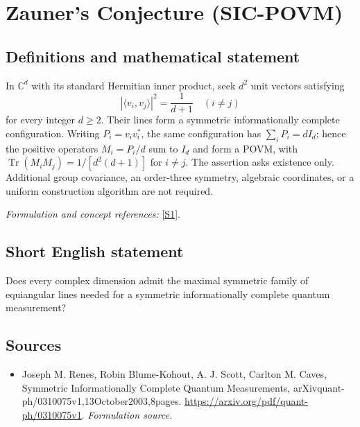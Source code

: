 \documentclass[11pt]{article}
\begin{document}
\section*{\texorpdfstring{Zauner's Conjecture (SIC-POVM)}{Zauner's Conjecture (SIC-POVM)}}\label{1305}
\subsection{Definitions and mathematical statement}
In ${\mathbb{C}}^d$ with its standard Hermitian inner product, seek $d^2$ unit vectors satisfying
\[
 |\langle v_i,v_j\rangle|^2=\frac1{d+1}\quad(i\ne j)
\]
for every integer $d\ge2$. Their lines form a symmetric informationally complete configuration. Writing $P_i=v_iv_i^*$, the same configuration has
$\sum_iP_i=dI_d$; hence the positive operators $M_i=P_i/d$ sum to $I_d$ and form a POVM, with
$\operatorname{Tr}(M_iM_j)=1/[d^2(d+1)]$ for $i\ne j$. The assertion asks existence only. Additional group covariance, an order-three symmetry, algebraic coordinates, or a uniform construction algorithm are not required.
\par\smallskip\textit{Formulation and concept references:} \href{https://arxiv.org/pdf/quant-ph/0310075v1}{[S1]}.

\subsection{Short English statement}
Does every complex dimension admit the maximal symmetric family of equiangular lines needed for a symmetric informationally complete quantum measurement?
\subsection{Sources}
\begin{itemize}
\item[S1]Joseph M. Renes, Robin Blume-Kohout, A. J. Scott, Carlton M. Caves, Symmetric Informationally Complete Quantum Measurements, arXivquant-ph/0310075v1,13October2003,8pages.
\url{https://arxiv.org/pdf/quant-ph/0310075v1}.
\textit{Formulation source.}
\end{itemize}
\end{document}
